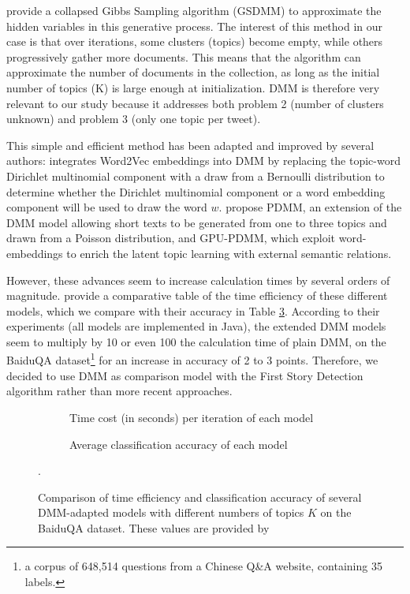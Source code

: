 \citet{yin_dirichlet_2014} provide a collapsed Gibbs Sampling algorithm (GSDMM) to approximate the hidden variables in this generative process. The interest of this method in our case is that over iterations, some clusters (topics) become empty, while others progressively gather more documents. This means that the algorithm can approximate the number of documents in the collection, as long as the initial number of topics (K) is large enough at initialization. DMM is therefore very relevant to our study because it addresses both problem 2 (number of clusters unknown) and problem 3 (only one topic per tweet).

This simple and efficient method has been adapted and improved by several authors:
\citet{nguyen2015improving} integrates Word2Vec embeddings into DMM by replacing the topic-word Dirichlet multinomial component with a draw from a Bernoulli distribution to determine whether the Dirichlet multinomial component or a word embedding component will be used to draw the word $w$. \citet{li_enhancing_2017} propose PDMM, an extension of the DMM model allowing short texts to be generated from one to three topics and drawn from a Poisson distribution, and GPU-PDMM, which exploit word-embeddings to enrich the latent topic learning with external semantic relations. 

However, these advances seem to increase calculation times by several orders of magnitude. \citet{li_enhancing_2017} provide a comparative table of the time efficiency of these different models, which we compare with their accuracy in Table \ref{Tab: BenchmarkDMM}. According to their experiments (all models are implemented in Java), the extended DMM models seem to multiply by 10 or even 100 the calculation time of plain DMM, on the BaiduQA dataset\footnote{a corpus of 648,514 questions from a Chinese Q\&A website, containing 35 labels.} for an increase in accuracy of 2 to 3 points. Therefore, we decided to use DMM as comparison model with the First Story Detection algorithm rather than more recent approaches.


\begin{figure}[h]
\centering
\begin{subfigure}{.5\textwidth}
  \centering
  
  \caption{Time cost (in seconds) per iteration of each model}
  \label{Tab: time_efficiency}
\end{subfigure}%
\begin{subfigure}{.5\textwidth}
  \centering
  
  \caption{Average classification accuracy of each model}
  \label{Tab: classification_accuracy}
\end{subfigure}
\caption{Comparison of time efficiency and classification accuracy of several DMM-adapted models with different numbers of topics $K$ on the BaiduQA dataset. These values are provided by \citet{li_enhancing_2017}}.
\label{Tab: BenchmarkDMM}
\end{figure}
 	 


